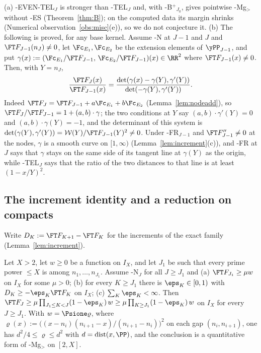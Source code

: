 \begin{remark}\label{rem:EVEN-TEL}
(a) \hyp{EVEN-TEL$_J$} is stronger than \hyp{TEL$_J$} and, with \hyp{B$^+$}$_{J_0}$, gives pointwise \hyp{Mg$_>$} without \hyp{ES}
(Theorem~\ref{thm:B}); on the computed data its margin shrinks (Numerical observation~\ref{obs:misc}(e)), so we do not
conjecture it.
(b) The following is proved, for any base kernel. Assume \hyp{N} at $J-1$ and $J$ and $\FT F_{J-1}(n_J)\ne0$, let
$\Fc_{E_1},\Fc_{E_2}$ be the extension elements of $\yPP_{J-1}$, and put
$\gamma(x):=(\Fc_{E_1}/\FT F_{J-1},\,\Fc_{E_2}/\FT F_{J-1})(x)\in\RR^2$ where $\FT F_{J-1}(x)\ne0$. Then, with $Y=n_J$,
\[
\frac{\FT F_J(x)}{\FT F_{J-1}(x)}=\frac{\det(\gamma(x)-\gamma(Y),\gamma'(Y))}{\det(-\gamma(Y),\gamma'(Y))}.
\]
Indeed $\FT F_J=\FT F_{J-1}+a\Fc_{E_1}+b\Fc_{E_2}$ (Lemma~\ref{lem:nodeadd}), so $\FT F_J/\FT F_{J-1}=1+(a,b)\cdot\gamma$; the
two conditions at $Y$ say $(a,b)\cdot\gamma'(Y)=0$ and $(a,b)\cdot\gamma(Y)=-1$, and the determinant of this system is
$\det(\gamma(Y),\gamma'(Y))=\mathcal W(Y)/\FT F_{J-1}(Y)^2\ne0$. Under \hyp{FR}$_{J-1}$ and $\FT F_{J-1}''\ne0$ at the
nodes, $\gamma$ is a smooth curve on $[1,\infty)$ (Lemma~\ref{lem:increment}(c)), and \hyp{FR} at $J$ says that $\gamma$
stays on the same side of its tangent line at $\gamma(Y)$ as the origin, while \hyp{TEL$_J$} says that the ratio of the
two distances to that line is at least $(1-x/Y)^2$.
\end{remark}

\subsection{The increment identity and a reduction on compacts}\label{ssec:FF}

Write $D_K:=\FT F_{K+1}-\FT F_K$ for the increments of the exact family (Lemma~\ref{lem:increment}).

\begin{theorem}\label{thm:T}
Let $X>2$, let $w\ge0$ be a function on $I_X$, and let $J_1$ be such that every prime power $\le X$ is among
$n_1,\dots,n_{J_1}$. Assume \hyp{N}$_J$ for all $J\ge J_1$ and
(a) $\FT F_{J_1}\ge\mu w$ on $I_X$ for some $\mu>0$;
(b) for every $K\ge J_1$ there is $\eps_K\in[0,1)$ with $D_K\ge-\eps_K\FT F_K$ on $I_X$;
(c) $\sum_K\eps_K<\infty$.
Then $\FT F_J\ge\mu\prod_{J_1\le K<J}(1-\eps_K)\,w\ge\mu\prod_{K\ge J_1}(1-\eps_K)\,w$ on $I_X$ for every $J\ge J_1$. With
$w=\Psione\varrho$, where $\varrho(x):=\bigl((x-n_i)(n_{i+1}-x)/(n_{i+1}-n_i)\bigr)^2$ on each gap $(n_i,n_{i+1})$, one has
$d^2/4\le\varrho\le d^2$ with $d=\operatorname{dist}(x,\PP)$, and the conclusion is a quantitative form of \hyp{Mg$_>$} on $[2,X]$.
\end{theorem}


